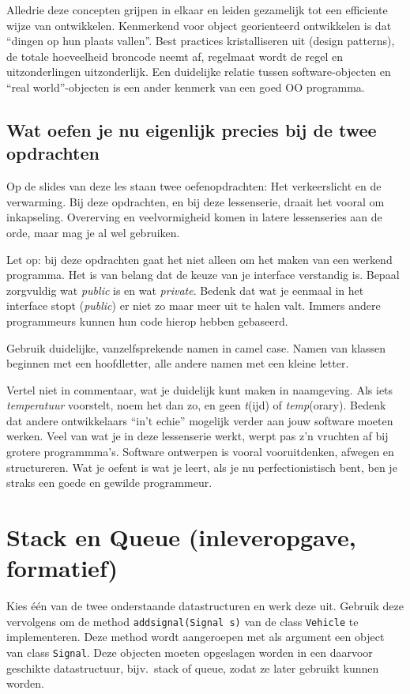 \documentclass[a4paper,10pt]{article}
\newcommand{\code}[1]{\texttt{#1}}
\begin{document}
Alledrie deze concepten grijpen in elkaar en leiden gezamelijk tot een efficiente wijze van ontwikkelen.
Kenmerkend voor object georienteerd ontwikkelen is dat ``dingen op hun plaats vallen''.
Best practices kristalliseren uit (design patterns), de totale hoeveelheid broncode neemt af, regelmaat wordt de regel en uitzonderlingen uitzonderlijk.
Een duidelijke relatie tussen software-objecten en ``real world''-objecten is een ander kenmerk van een goed OO programma.

\subsection*{Wat oefen je nu eigenlijk precies bij de twee opdrachten}

Op de slides van deze les staan twee oefenopdrachten: Het verkeerslicht en de verwarming.
Bij deze opdrachten, en bij deze lessenserie, draait het vooral om inkapseling.
Overerving en veelvormigheid komen in latere lessenseries aan de orde, maar mag je al wel gebruiken.

Let op: bij deze opdrachten gaat het niet alleen om het maken van een werkend programma.
Het is van belang dat de keuze van je interface verstandig is.
Bepaal zorgvuldig wat \emph{public} is en wat \emph{private}.
Bedenk dat wat je eenmaal in het interface stopt (\emph{public}) er niet zo maar meer uit te halen valt.
Immers andere programmeurs kunnen hun code hierop hebben gebaseerd.

Gebruik duidelijke, vanzelfsprekende namen in camel case.
Namen van klassen beginnen met een hoofdletter, alle andere namen met een kleine letter.

Vertel niet in commentaar, wat je duidelijk kunt maken in naamgeving.
Als iets \emph{temperatuur} voorstelt, noem het dan zo, en geen \emph{t}(ijd) of \emph{temp}(orary).
Bedenk dat andere ontwikkelaars ``in't echie'' mogelijk verder aan jouw software moeten werken.
Veel van wat je in deze lessenserie werkt, werpt pas z'n vruchten af bij grotere programmma's.
Software ontwerpen is vooral vooruitdenken, afwegen en structureren.
Wat je oefent is wat je leert, als je nu perfectionistisch bent, ben je straks een goede en gewilde programmeur.


\section{Stack en Queue (inleveropgave, formatief)}
Kies één van de twee onderstaande datastructuren en werk deze uit. Gebruik deze vervolgens om de method \code{addsignal(Signal s)} van de class \code{Vehicle} te implementeren. Deze method wordt aangeroepen met als argument een object van class \code{Signal}. Deze objecten moeten opgeslagen worden in een daarvoor geschikte datastructuur, bijv.\ stack of queue, zodat ze later gebruikt kunnen worden. 
\end{document}
